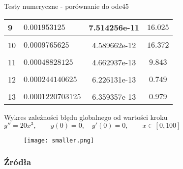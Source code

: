 \documentclass[9pt]{beamer}
\begin{document}
\begin{frame}{Testy numeryczne - porównanie do ode45}
\begin{table}[]
{\begin{tabular}{|l|l|S|c|}
9  & $ 0.001953125     $ & 7.514256e-11 & $ 16.025 $ \\ [-1pt]   \hline & & & \\ [-10pt]
10 & $ 0.0009765625    $ & 4.589662e-12 & $ 16.372 $ \\ [-1pt]   \hline & & & \\ [-10pt]
11 & $ 0.00048828125   $ & 4.662937e-13 & $ 9.843  $\\ [-1pt]   \hline & & & \\ [-10pt]
12 & $ 0.000244140625  $ & 6.226131e-13 & $ 0.749  $\\ [-1pt]   \hline & & & \\ [-10pt]
13 & $ 0.0001220703125 $ & 6.359357e-13 & $ 0.979  $\\ \hline %
            \end{tabular}
    	}
    \end{table}
\end{frame}

\begin{frame}{Wykres zależności błędu globalnego od wartości kroku}
    \centering
    $y'' = 20x^3, \qquad y(0) = 0, \quad y'(0) = 0, \qquad x\in[0,100]$
    \begin{figure}
        \centering
        \texttt{[image: smaller.png]}
    \end{figure}
    
\end{frame}

\begin{frame}
	\frametitle{Źródła}
    \nocite{*}
    \printbibliography
\end{frame}
\end{document}
